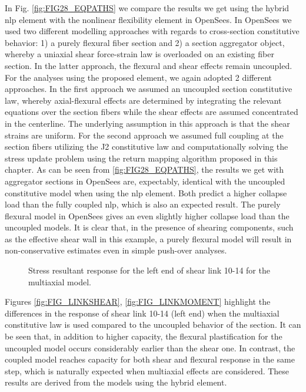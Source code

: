 In Fig. \ref{fig:FIG28_EQPATHS} we 
compare the results we get using the hybrid \acrshort{nlp} element with the 
nonlinear flexibility element in 
OpenSees\cite{OpenSees}. In OpenSees we used two different modelling approaches 
with regards to cross-section constitutive behavior: 1) a purely flexural fiber 
section and 2) a section aggregator object, whereby a uniaxial shear 
force-strain law is overloaded on an existing fiber section. In the latter 
approach, the flexural and shear effects remain uncoupled. For the analyses 
using the proposed element, we again adopted 2 different approaches. In the 
first approach we assumed an uncoupled section constitutive law, whereby 
axial-flexural effects are determined by integrating the relevant equations 
over the section fibers while the shear effects are assumed concentrated in the 
centerline. The underlying assumption in this approach is that the shear 
strains are uniform. For the second approach we assumed full coupling at the 
section fibers utilizing the J2 constitutive law and computationally solving 
the stress update problem using the return mapping algorithm proposed in this 
chapter. As can be seen 
from \ref{fig:FIG28_EQPATHS}, the results we get with aggregator sections in 
OpenSees are, expectably, identical with the uncoupled constitutive model when 
using the \acrshort{nlp} element. Both predict a higher  
collapse load than the fully coupled \acrshort{nlp}, which is also an expected 
result. The purely flexural model in OpenSees gives an even slightly higher 
collapse load than the uncoupled models. It is clear that, in the presence of 
shearing components, such as the effective shear wall in this example, a purely 
flexural model will result in non-conservative estimates even in simple 
push-over analyses. 

\begin{figure}[H]
	\centering
	\caption{Stress resultant response for the left end of shear link 10-14 for 
		the multiaxial model.}
	\label{fig:FIGLINKS}
\end{figure}



Figures \ref{fig:FIG_LINKSHEAR}, \ref{fig:FIG_LINKMOMENT} highlight the 
differences in the response of shear link 10-14 (left end) when the multiaxial 
constitutive law is used compared to the uncoupled behavior of the section. It 
can be seen that, in addition to higher capacity, the flexural plastification 
for the uncoupled model occurs considerably earlier than the shear one. In 
contrast, the coupled model reaches capacity for both shear and flexural 
response in the same step, which is naturally expected when multiaxial effects 
are considered. These results are derived from the models using the hybrid 
element.

